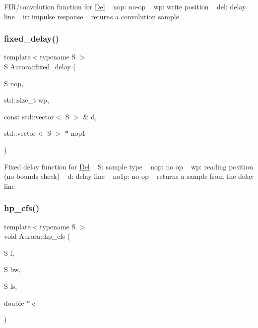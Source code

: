 F\+I\+R/convolution function for \hyperlink{class_aurora_1_1_del}{Del} ~\newline
nop\+: no-\/op ~\newline
wp\+: write position ~\newline
del\+: delay line ~\newline
ir\+: impulse response ~\newline
returns a convolution sample \mbox{\label{namespace_aurora_afe9bb9ea0f50912f1fc95a2b15b135dd}} 
\subsubsection{\texorpdfstring{fixed\+\_\+delay()}{fixed\_delay()}}
{\footnotesize\ttfamily template$<$typename S $>$ \\
S Aurora\+::fixed\+\_\+delay (\begin{DoxyParamCaption}\item[{S}]{nop,  }\item[{std\+::size\+\_\+t}]{wp,  }\item[{const std\+::vector$<$ S $>$ \&}]{d,  }\item[{std\+::vector$<$ S $>$ $\ast$}]{nop1 }\end{DoxyParamCaption})\hspace{0.3cm}{\ttfamily [inline]}}

Fixed delay function for \hyperlink{class_aurora_1_1_del}{Del} ~\newline
S\+: sample type ~\newline
nop\+: no op ~\newline
wp\+: reading position (no bounds check) ~\newline
d\+: delay line ~\newline
no1p\+: no op ~\newline
returns a sample from the delay line \mbox{\label{namespace_aurora_a51c342d920dfc9f5d5538ff79f47b0e3}} 
\subsubsection{\texorpdfstring{hp\+\_\+cfs()}{hp\_cfs()}}
{\footnotesize\ttfamily template$<$typename S $>$ \\
void Aurora\+::hp\+\_\+cfs (\begin{DoxyParamCaption}\item[{S}]{f,  }\item[{S}]{bw,  }\item[{S}]{fs,  }\item[{double $\ast$}]{c }\end{DoxyParamCaption})\hspace{0.3cm}{\ttfamily [inline]}}

